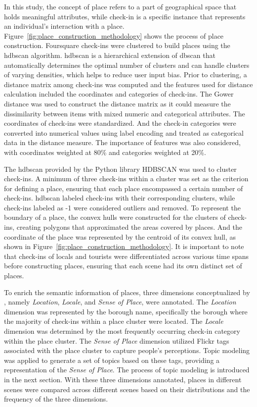 \documentclass{article}
\theoremstyle{remark}
\begin{document}
In this study, the concept of place refers to a part of geographical space that holds meaningful attributes, while check-in is a specific instance that represents an individual's interaction with a place. Figure~\ref{fig:place_construction_methodology} shows the process of place construction. Foursquare check-ins were clustered to build places using the \acrfull{hdbscan} \citep{campello_density-based_2013} algorithm. \acrshort{hdbscan} is a hierarchical extension of \acrshort{dbscan} that automatically determines the optimal number of clusters and can handle clusters of varying densities, which helps to reduce user input bias. Prior to clustering, a distance matrix among check-ins was computed and the features used for distance calculation included the coordinates and categories of check-ins. The Gower distance \citep{gower_general_1971} was used to construct the distance matrix as it could measure the dissimilarity between items with mixed numeric and categorical attributes. The coordinates of check-ins were standardized. And the check-in categories were converted into numerical values using label encoding and treated as categorical data in the distance measure. The importance of features was also considered, with coordinates weighted at 80\% and categories weighted at 20\%.

The hdbscan provided by the Python library HDBSCAN \citep{mcinnes_hdbscan_2017} was used to cluster check-ins. A minimum of three check-ins within a cluster was set as the criterion for defining a place, ensuring that each place encompassed a certain number of check-ins. \acrshort{hdbscan} labeled check-ins with their corresponding clusters, while check-ins labeled as -1 were considered outliers and removed. To represent the boundary of a place, the convex hulls were constructed for the clusters of check-ins, creating polygons that approximated the areas covered by places. And the coordinate of the place was represented by the centroid of its convex hull, as shown in Figure~\ref{fig:place_construction_methodology}. It is important to note that check-ins of locals and tourists were differentiated across various time spans before constructing places, ensuring that each scene had its own distinct set of places.

To enrich the semantic information of places, three dimensions conceptualized by \cite{agnew_space_2011}, namely \textit{Location}, \textit{Locale}, and \textit{Sense of Place}, were annotated. The \textit{Location} dimension was represented by the borough name, specifically the borough where the majority of check-ins within a place cluster were located. The \textit{Locale} dimension was determined by the most frequently occurring check-in category within the place cluster. The \textit{Sense of Place} dimension utilized Flickr tags associated with the place cluster to capture people's perceptions. Topic modeling was applied to generate a set of topics based on these tags, providing a representation of the \textit{Sense of Place}. The process of topic modeling is introduced in the next section. With these three dimensions annotated, places in different scenes were compared across different scenes based on their distributions and the frequency of the three dimensions.
\end{document}
